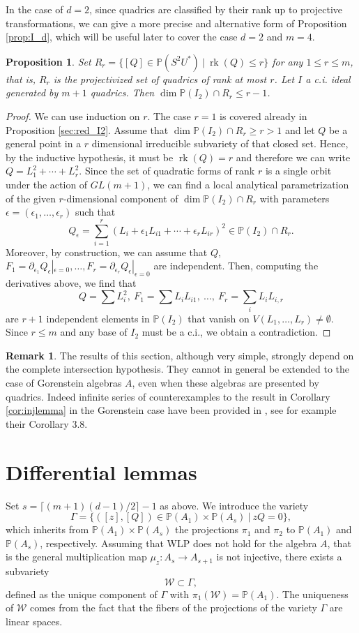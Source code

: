 \documentclass[10pt, a4paper]{amsart}
\theoremstyle{plain}
\newtheorem{prop}{Proposition}
\theoremstyle{definition}
\newtheorem{rmk}{Remark}
\theoremstyle{remark}
\def\PP{\mathbb{P}}
\begin{document}
 In the case of $d=2$, since quadrics are classified by their rank up to projective transformations, we can give a more precise and alternative form
 of Proposition \ref{prop:I_d}, which will be useful later to cover the case $d=2$ and $m=4$.
 \begin{prop}\label{prop:stratI2} Set $R_r=\{ [Q]\in \PP(S^2U^\ast)\ |\ \operatorname{rk}(Q)\leq r\}$ for any $1\leq r\leq m$, that is, $R_r$ is the projectivized set of quadrics of rank at most $r$. Let $I$ a c.i. ideal generated by $m+1$ quadrics. Then $\dim \PP(I_2)\cap R_r\leq r-1$.
 \end{prop}
 \begin{proof} We can use induction on $r$. The case $r=1$ is covered already in Proposition \ref{sec:red_I2}. Assume that $\dim\PP(I_2)\cap R_r\geq r>1$ and let $Q$ be a general point in a $r$ dimensional irreducible subvariety of that closed set. Hence, by the inductive hypothesis, it must be $\operatorname{rk}(Q)=r$ and therefore we can write $Q=L_1^2+\cdots+L_r^2$. Since the set of quadratic forms of rank $r$ is a single orbit under the action of $GL(m+1)$, we can find a local analytical parametrization of the given $r$-dimensional component of $\dim\PP(I_2)\cap R_r$ with parameters $\epsilon=(\epsilon_1,\ldots,\epsilon_r)$ such that 
 $$Q_\epsilon=\sum_{i=1}^r(L_i+\epsilon_1L_{i1}+\cdots+\epsilon_rL_{ir})^2\in \PP(I_2)\cap R_r.$$
 Moreover, by construction, we can assume that $Q$, $F_1=\partial_{\epsilon_1}Q_\epsilon|_{\epsilon=0},\ldots,F_r=\partial_{\epsilon_r}Q_\epsilon|_{\epsilon=0}$ are independent. Then, computing the derivatives above, we find that $$Q=\sum L_i^2,\ F_1=\sum L_iL_{i1},\ \ldots,\ F_r=\sum_iL_iL_{i,r}$$ are $r+1$ independent elements in $\PP(I_2)$ that vanish on $V(L_1,\ldots, L_r)\not=\emptyset$. Since $r\leq m$ and any base of $I_2$ must be a c.i., we obtain a contradiction.
 \end{proof}
\begin{rmk}
The results of this section, although very simple, strongly depend on the complete intersection hypothesis. They cannot in general be extended to the case of Gorenstein algebras $A$, even when these algebras are presented by quadrics. Indeed infinite series of counterexamples to the result in Corollary \ref{cor:injlemma} in the Gorenstein case have been provided in \cite{GoZa}, see for example their  Corollary 3.8.
\end{rmk}
 \section{Differential lemmas}\label{sec:diff}
 Set $s=\lceil(m+1)(d-1)/2\rceil-1$ as above. We introduce the variety
 $$\Gamma=\{([z],[Q])\in \PP(A_1)\times\PP(A_s)\ |\ zQ=0\},$$ which inherits from $\PP(A_1)\times\PP(A_s)$ the projections $\pi_1$ and $\pi_2$ to $\PP(A_1)$ and $\PP(A_s)$, respectively. 
 Assuming that WLP does not hold for the algebra $A$, that is the general multiplication map
 $\mu_z\colon A_s\to A_{s+1}$ is not injective, there exists a subvariety  $$\mathcal{W}\subset \Gamma,$$
defined as the unique component of $\Gamma$ with $\pi_1(\mathcal{W})=\PP(A_1)$. The uniqueness of $\mathcal{W}$ comes from the fact that the fibers of the projections of the variety $\Gamma$ are linear spaces.
\end{document}
